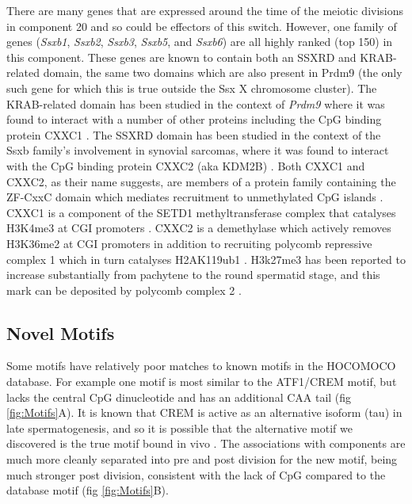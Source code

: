 \label{sec:ssx}
There are many genes that are expressed around the time of the meiotic divisions in component 20 and so could be effectors of this switch. However, one family of genes (\textit{Ssxb1}, \textit{Ssxb2}, \textit{Ssxb3}, \textit{Ssxb5}, and \textit{Ssxb6}) are all highly ranked (top 150) in this component. These genes are known to contain both an SSXRD and KRAB-related domain, the same two domains which are also present in Prdm9 (the only such gene for which this is true outside the Ssx X chromosome cluster). The KRAB-related domain has been studied in the context of \textit{Prdm9} where it was found to interact with a number of other proteins including the CpG binding protein CXXC1 \parencite{Imai2017PRDM9, Parvanov2017PRDM9}. The SSXRD domain has been studied in the context of the Ssxb family's involvement in synovial sarcomas, where it was found to interact with the CpG binding protein CXXC2 (aka KDM2B) \parencite{Banito2018SS18SSX}. Both CXXC1 and CXXC2, as their name suggests, are members of a protein family containing the ZF-CxxC domain which mediates recruitment to unmethylated CpG islands \parencite[reviewed in]{Long2013ZFCxxC}. CXXC1 is a component of the SETD1 methyltransferase complex that catalyses H3K4me3 at CGI promoters \parencite{Lee2005CpGbinding}. CXXC2 is a demethylase which actively removes H3K36me2 at CGI promoters in addition to recruiting polycomb repressive complex 1 which in turn catalyses H2AK119ub1 \parencite{He2008H3K36, Farcas2012KDM2B, He2013Kdm2b, Wu2013Fbxl10}. H3k27me3 has been reported to increase substantially from pachytene to the round spermatid stage, and this mark can be deposited by polycomb complex 2 \parencite{Sin2015Poised}.


  
\subsection{Novel Motifs}

Some motifs have relatively poor matches to known motifs in the HOCOMOCO database. For example one motif is most similar to the ATF1/CREM motif, but lacks the central CpG dinucleotide and has an additional CAA tail (fig \ref{fig:Motifs}A). It is known that CREM is active as an alternative isoform (tau) in late spermatogenesis, and so it is possible that the alternative motif we discovered is the true motif bound in vivo \parencite{Sassone-Corsi2000CREM}. The associations with components are much more cleanly separated into pre and post division for the new motif, being much stronger post division, consistent with the lack of CpG compared to the database motif (fig \ref{fig:Motifs}B).


